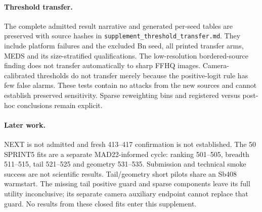 \paragraph{Threshold transfer.}
The complete admitted result narrative and generated per-seed tables are preserved with source hashes in \texttt{supplement\_threshold\_transfer.md}. They include platform failures and the excluded Bn seed, all printed transfer arms, MEDS and its size-stratified qualifications. The low-resolution bordered-source finding does not transfer automatically to sharp FFHQ images. Camera-calibrated thresholds do not transfer merely because the positive-logit rule has few false alarms. These tests contain no attacks from the new sources and cannot establish preserved sensitivity. Sparse reweighting bins and registered versus post-hoc conclusions remain explicit.

\paragraph{Later work.}
NEXT is not admitted and fresh 413--417 confirmation is not established. The 50 SPRINT5 fits are a separate MAD22-informed cycle: ranking 501--505, breadth 511--515, tail 521--525 and geometry 531--535. Submission and technical smoke success are not scientific results. Tail/geometry short pilots share an Sb408 warmstart. The missing tail positive guard and sparse components leave its full utility inconclusive; its separate camera auxiliary endpoint cannot replace that guard. No results from these closed fits enter this supplement.
